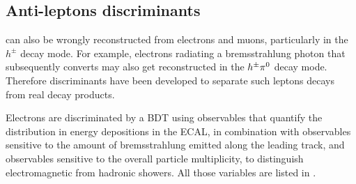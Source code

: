 \subsection{Anti-leptons discriminants}

\tauh can also be wrongly reconstructed from electrons and muons, particularly in the $h^{\pm}$ decay mode. For example, electrons radiating a bremsstrahlung photon that subsequently converts may also get reconstructed in the $h^{\pm}\pi^{0}$ decay mode. Therefore discriminants have been developed to separate such leptons decays from real \tauh decay products.

Electrons are discriminated by a BDT using observables that quantify the distribution in energy depositions in the ECAL, in combination with observables sensitive to the amount of bremsstrahlung emitted along the leading track, and observables sensitive to the overall particle multiplicity, to distinguish electromagnetic from hadronic showers.
All those variables are listed in \cite{tauh_reconstruction}.
    
